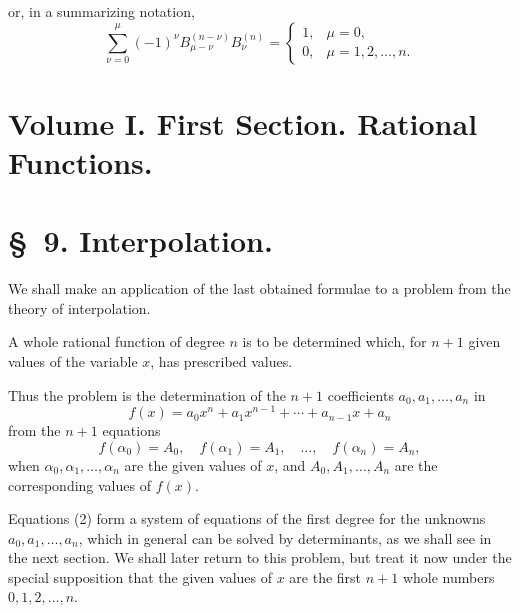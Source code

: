 \documentclass[11pt]{article}
\begin{document}
or, in a summarizing notation,
\begin{equation}
 \sum_{\nu=0}^{\mu}(-1)^\nu B_{\mu-\nu}^{(n-\nu)}B_\nu^{(n)}
 =\begin{cases}
 1,&\mu=0,\\
 0,&\mu=1,2,\ldots,n.
 \end{cases}
\tag{8}
\end{equation}


\clearpage
\section*{Volume I. First Section. Rational Functions.}

\section*{\S~9. Interpolation.}

We shall make an application of the last obtained formulae to a problem from the theory of interpolation.

A whole rational function of degree $n$ is to be determined which, for $n+1$ given values of the variable $x$, has prescribed values.

Thus the problem is the determination of the $n+1$ coefficients $a_0,a_1,\ldots,a_n$ in
\begin{equation}
 f(x)=a_0x^n+a_1x^{n-1}+\cdots+a_{n-1}x+a_n
\tag{1}
\end{equation}
from the $n+1$ equations
\begin{equation}
 f(\alpha_0)=A_0,\quad f(\alpha_1)=A_1,\quad \ldots,\quad f(\alpha_n)=A_n,
\tag{2}
\end{equation}
when $\alpha_0,\alpha_1,\ldots,\alpha_n$ are the given values of $x$, and $A_0,A_1,\ldots,A_n$ are the corresponding values of $f(x)$.

Equations (2) form a system of equations of the first degree for the unknowns $a_0,a_1,\ldots,a_n$, which in general can be solved by determinants, as we shall see in the next section. We shall later return to this problem, but treat it now under the special supposition that the given values of $x$ are the first $n+1$ whole numbers $0,1,2,\ldots,n$.
\end{document}
